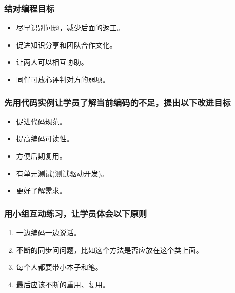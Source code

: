 \hypertarget{ux7ed3ux5bf9ux7f16ux7a0bux76eeux6807}{%
\subsubsection{结对编程目标}\label{ux7ed3ux5bf9ux7f16ux7a0bux76eeux6807}}

\begin{itemize}
\tightlist
\item
  尽早识别问题，减少后面的返工。
\item
  促进知识分享和团队合作文化。
\item
  让两人可以相互协助。
\item
  同伴可放心评判对方的弱项。\\
\end{itemize}

\hypertarget{ux5148ux7528ux4ee3ux7801ux5b9eux4f8bux8ba9ux5b66ux5458ux4e86ux89e3ux5f53ux524dux7f16ux7801ux7684ux4e0dux8db3ux63d0ux51faux4ee5ux4e0bux6539ux8fdbux76eeux6807}{%
\subsubsection{先用代码实例让学员了解当前编码的不足，提出以下改进目标}\label{ux5148ux7528ux4ee3ux7801ux5b9eux4f8bux8ba9ux5b66ux5458ux4e86ux89e3ux5f53ux524dux7f16ux7801ux7684ux4e0dux8db3ux63d0ux51faux4ee5ux4e0bux6539ux8fdbux76eeux6807}}

\begin{itemize}
\tightlist
\item
  促进代码规范。
\item
  提高编码可读性。
\item
  方便后期复用。
\item
  有单元测试(测试驱动开发)。
\item
  更好了解需求。
\end{itemize}

\hypertarget{ux7528ux5c0fux7ec4ux4e92ux52a8ux7ec3ux4e60ux8ba9ux5b66ux5458ux4f53ux4f1aux4ee5ux4e0bux539fux5219}{%
\subsubsection{用小组互动练习，让学员体会以下原则}\label{ux7528ux5c0fux7ec4ux4e92ux52a8ux7ec3ux4e60ux8ba9ux5b66ux5458ux4f53ux4f1aux4ee5ux4e0bux539fux5219}}

\begin{enumerate}
\tightlist
\item
  一边编码一边说话。\\
\item
  不断的同步问问题，比如这个方法是否应放在这个类上面。\\
\item
  每个人都要带小本子和笔。\\
\item
  最后应该不断的重用、复用。\\
\end{enumerate}

